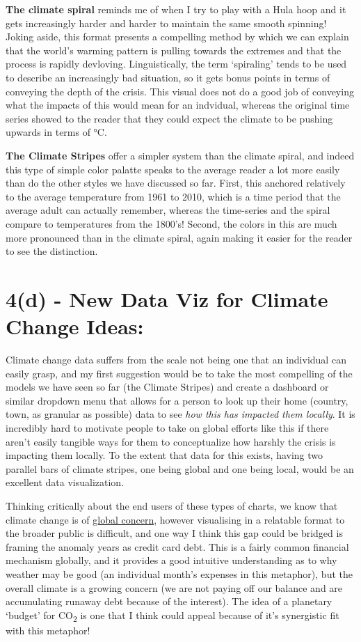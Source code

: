 \documentclass[
  letterpaper,
  DIV=11,
  numbers=noendperiod]{scrartcl}
\begin{document}
\textbf{The climate spiral} reminds me of when I try to play with a Hula
hoop and it gets increasingly harder and harder to maintain the same
smooth spinning! Joking aside, this format presents a compelling method
by which we can explain that the world's warming pattern is pulling
towards the extremes and that the process is rapidly devloving.
Linguistically, the term `spiraling' tends to be used to describe an
increasingly bad situation, so it gets bonus points in terms of
conveying the depth of the crisis. This visual does not do a good job of
conveying what the impacts of this would mean for an indvidual, whereas
the original time series showed to the reader that they could expect the
climate to be pushing upwards in terms of °C.

\textbf{The Climate Stripes} offer a simpler system than the climate
spiral, and indeed this type of simple color palatte speaks to the
average reader a lot more easily than do the other styles we have
discussed so far. First, this anchored relatively to the average
temperature from 1961 to 2010, which is a time period that the average
adult can actually remember, whereas the time-series and the spiral
compare to temperatures from the 1800's! Second, the colors in this are
much more pronounced than in the climate spiral, again making it easier
for the reader to see the distinction.

\section{4(d) - New Data Viz for Climate Change
Ideas:}\label{d---new-data-viz-for-climate-change-ideas}

Climate change data suffers from the scale not being one that an
individual can easily grasp, and my first suggestion would be to take
the most compelling of the models we have seen so far (the Climate
Stripes) and create a dashboard or similar dropdown menu that allows for
a person to look up their home (country, town, as granular as possible)
data to see \emph{how this has impacted them locally}. It is incredibly
hard to motivate people to take on global efforts like this if there
aren't easily tangible ways for them to conceptualize how harshly the
crisis is impacting them locally. To the extent that data for this
exists, having two parallel bars of climate stripes, one being global
and one being local, would be an excellent data visualization.

Thinking critically about the end users of these types of charts, we
know that climate change is of
\href{https://climatepromise.undp.org/news-and-stories/worlds-largest-survey-climate-change-out-heres-what-results-show}{global
concern}, however visualising in a relatable format to the broader
public is difficult, and one way I think this gap could be bridged is
framing the anomaly years as credit card debt. This is a fairly common
financial mechanism globally, and it provides a good intuitive
understanding as to why weather may be good (an individual month's
expenses in this metaphor), but the overall climate is a growing concern
(we are not paying off our balance and are accumulating runaway debt
because of the interest). The idea of a planetary `budget' for
CO\textsubscript{2} is one that I think could appeal because of it's
synergistic fit with this metaphor!
\end{document}

